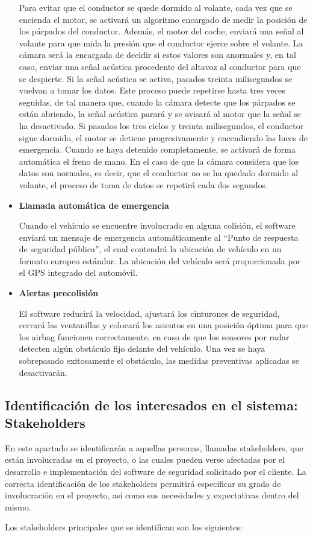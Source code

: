 \begin{itemize}[-]
\par Para evitar que el conductor se quede dormido al volante, cada vez que se encienda el motor, se activará un algoritmo encargado de medir la posición de los párpados del conductor. Además, el motor del coche, enviará una señal al volante para que mida la presión que el conductor ejerce sobre el volante. La cámara será la encargada de decidir si estos valores son anormales y, en tal caso, enviar una señal acústica procedente del altavoz al conductor para que se despierte. Si la señal acústica se activa, pasados treinta milisegundos se vuelvan a tomar los datos. Este proceso puede repetirse hasta tres veces seguidas, de tal manera que, cuando la cámara detecte que los párpados se están abriendo, la señal acústica parará y se avisará al motor que la señal se ha desactivado. Si pasados los tres ciclos y treinta milisegundos, el conductor sigue dormido, el motor se detiene progresivamente y encendiendo las luces de emergencia. Cuando se haya detenido completamente, se activará de forma automática el freno de mano. En el caso de que la cámara considera que los datos son normales, es decir, que el conductor no se ha quedado dormido al volante, el proceso de toma de datos se repetirá cada dos segundos.
\item \textbf{Llamada automática de emergencia}
\par Cuando el vehículo se encuentre involucrado en alguna colisión, el software enviará un mensaje de emergencia automáticamente al “Punto de respuesta de seguridad pública”, el cual contendrá la ubicación de vehículo en un formato europeo estándar. La ubicación del vehículo será proporcionada por el GPS integrado del automóvil.
\item \textbf{Alertas precolisión}
\par El software reducirá la velocidad, ajustará los cinturones de seguridad, cerrará las ventanillas y colocará los asientos en una posición óptima para que los airbag funcionen correctamente, en caso de que los sensores por radar detecten algún obstáculo fijo delante del vehículo. Una vez se haya sobrepasado exitosamente el obstáculo, las medidas preventivas aplicadas se desactivarán.
\end{itemize}

\subsection {Identificación de los interesados en el sistema: Stakeholders}
\par En este apartado se identificarán a aquellas personas, llamadas stakeholders, que están involucradas en el proyecto, o las cuales pueden verse afectadas por el desarrollo e implementación del software de seguridad solicitado por el cliente. La correcta identificación de los stakeholders permitirá especificar su grado de involucración en el proyecto, así como sus necesidades y expectativas dentro del mismo.
\par Los stakeholders principales que se identifican son los siguientes:

